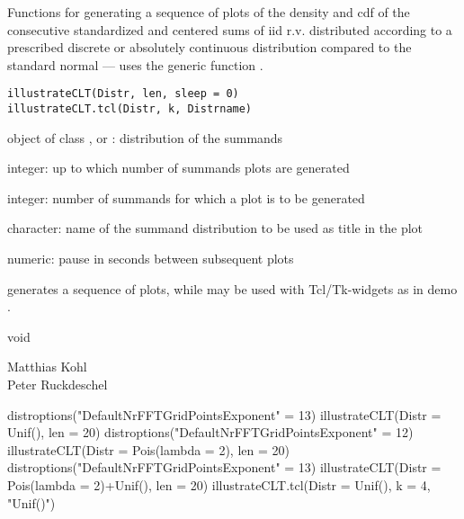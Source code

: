 \begin{Description}\relax
Functions for generating a sequence of plots of
the density and cdf of the consecutive standardized and centered sums of iid 
r.v. distributed according to a prescribed discrete or absolutely continuous 
distribution compared to the standard normal --- uses the generic function 
.
\end{Description}
\begin{Usage}
\begin{verbatim}illustrateCLT(Distr, len, sleep = 0)
illustrateCLT.tcl(Distr, k, Distrname)
\end{verbatim}
\end{Usage}
\begin{Arguments}
\begin{ldescription}
\item[\code{Distr}] object of class , 
 or : distribution of 
the summands
\item[\code{len}] integer: up to which number of summands plots are generated
\item[\code{k}] integer: number of summands for which a plot is to be generated
\item[\code{Distrname}] character: name of the summand distribution to be used as 
title in the plot
\item[\code{sleep}] numeric: pause in seconds between subsequent plots 
\end{ldescription}
\end{Arguments}
\begin{Details}\relax
{} generates a sequence of plots, while 
 may be used with Tcl/Tk-widgets as in demo 
.
\end{Details}
\begin{Value}
void
\end{Value}
\begin{Author}\relax
Matthias Kohl \\
Peter Ruckdeschel 
\end{Author}
\begin{SeeAlso}\relax
{}
\end{SeeAlso}
\begin{Examples}
\begin{ExampleCode}
distroptions("DefaultNrFFTGridPointsExponent" = 13)
illustrateCLT(Distr = Unif(), len = 20)
distroptions("DefaultNrFFTGridPointsExponent" = 12)
illustrateCLT(Distr = Pois(lambda = 2), len = 20)
distroptions("DefaultNrFFTGridPointsExponent" = 13)
illustrateCLT(Distr = Pois(lambda = 2)+Unif(), len = 20)
illustrateCLT.tcl(Distr = Unif(), k = 4, "Unif()")
\end{ExampleCode}
\end{Examples}

